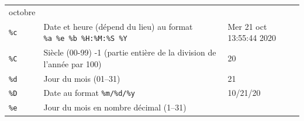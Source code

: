 \documentclass[
  11pt,
]{book}
\numberwithin{equation}{section}
\numberwithin{countremarque}{section}
\begin{document}
\begin{longtable}[]{@{}lll@{}}
\begin{minipage}[t]{0.29\columnwidth}
octobre\strut
\end{minipage}\tabularnewline
\begin{minipage}[t]{0.20\columnwidth}\raggedright
\texttt{\%c}\strut
\end{minipage} & \begin{minipage}[t]{0.42\columnwidth}\raggedright
Date et heure (dépend du lieu) au format \texttt{\%a\ \%e\ \%b\ \%H:\%M:\%S\ \%Y}\strut
\end{minipage} & \begin{minipage}[t]{0.29\columnwidth}\raggedright
Mer 21 oct 13:55:44 2020\strut
\end{minipage}\tabularnewline
\begin{minipage}[t]{0.20\columnwidth}\raggedright
\texttt{\%C}\strut
\end{minipage} & \begin{minipage}[t]{0.42\columnwidth}\raggedright
Siècle (00-99) -1 (partie entière de la division de l'année par 100)\strut
\end{minipage} & \begin{minipage}[t]{0.29\columnwidth}\raggedright
20\strut
\end{minipage}\tabularnewline
\begin{minipage}[t]{0.20\columnwidth}\raggedright
\texttt{\%d}\strut
\end{minipage} & \begin{minipage}[t]{0.42\columnwidth}\raggedright
Jour du mois (01--31)\strut
\end{minipage} & \begin{minipage}[t]{0.29\columnwidth}\raggedright
21\strut
\end{minipage}\tabularnewline
\begin{minipage}[t]{0.20\columnwidth}\raggedright
\texttt{\%D}\strut
\end{minipage} & \begin{minipage}[t]{0.42\columnwidth}\raggedright
Date au format \texttt{\%m/\%d/\%y}\strut
\end{minipage} & \begin{minipage}[t]{0.29\columnwidth}\raggedright
10/21/20\strut
\end{minipage}\tabularnewline
\begin{minipage}[t]{0.20\columnwidth}\raggedright
\texttt{\%e}\strut
\end{minipage} & \begin{minipage}[t]{0.42\columnwidth}\raggedright
Jour du mois en nombre décimal (1--31)\strut
\end{minipage} & \begin{minipage}[t]{0.29\columnwidth}\raggedright

\end{minipage}
\end{longtable}
\end{document}
